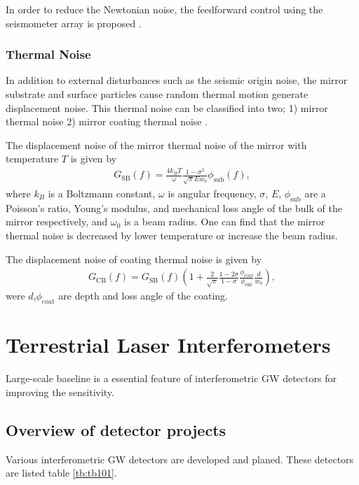 In order to reduce the Newtonian noise, the feedforward control using the seismometer array is proposed \cite{driggers2015noise}.

\subsubsection{Thermal Noise}
In addition to external disturbances such as the seismic origin noise, the mirror substrate and surface particles cause random thermal motion generate displacement noise. This thermal noise can be classified into two; 1) mirror thermal noise 2) mirror coating thermal noise \cite{dan2016study}.

The displacement noise of the mirror thermal noise of the mirror with temperature $T$ is given by \cite{levin1998internal,numata2003wide}
\begin{eqnarray}
  G_{\mathrm{SB}}(f)=\frac{4 k_{B} T}{\omega} \frac{1-\sigma^{2}}{\sqrt{\pi} E w_{0}} \phi_{\mathrm{sub}}(f),
  \label{eq:eq140}
\end{eqnarray}
where $k_{B}$ is a Boltzmann constant, $\omega$ is angular frequency, $\sigma,\,E,\, \phi_{\mathrm{sub}}$ are a Poisson's ratio, Young's modulus, and mechanical loss angle of the bulk of the mirror respectively, and $\omega_0$ is a beam radius. One can find that the mirror thermal noise is decreased by lower temperature or increase the beam radius.

The displacement noise of coating thermal noise is given by \cite{numata2003wide,harry2002thermal}
\begin{eqnarray}
  G_{\mathrm{CB}}(f)=G_{\mathrm{SB}}(f)\left(1+\frac{2}{\sqrt{\pi}} \frac{1-2 \sigma}{1-\sigma} \frac{\phi_{\mathrm{coat}}}{\phi_{\mathrm{sub}}} \frac{d}{w_{0}}\right), 
\end{eqnarray}
were $d$,$\phi_{\mathrm{coat}}$ are depth and loss angle of the coating.


\newpage
\section{Terrestrial Laser Interferometers}
Large-scale baseline is a essential feature of interferometric GW detectors for improving the sensitivity. 

\subsection{Overview of detector projects}
Various interferometric GW detectors are developed and planed. These detectors are listed table \ref{tb:tb101}. 

